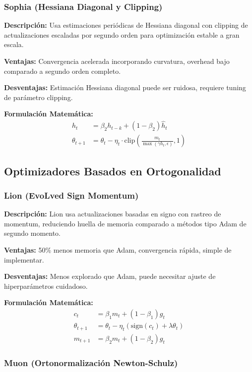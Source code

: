 \documentclass[11pt,a4paper]{article}
\begin{document}
\subsubsection{Sophia (Hessiana Diagonal y Clipping)}

\textbf{Descripción:} Usa estimaciones periódicas de Hessiana diagonal con clipping de actualizaciones escaladas por segundo orden para optimización estable a gran escala.

\textbf{Ventajas:} Convergencia acelerada incorporando curvatura, overhead bajo comparado a segundo orden completo.

\textbf{Desventajas:} Estimación Hessiana diagonal puede ser ruidosa, requiere tuning de parámetro clipping.

\textbf{Formulación Matemática:}
\begin{align}
h_t &= \beta_2 h_{t-k} + (1 - \beta_2) \hat{h}_t \\
\theta_{t+1} &= \theta_t - \eta_t \cdot \text{clip} \left( \frac{m_t}{\max(\gamma h_t, \epsilon)}, 1 \right)
\end{align}

\subsection{Optimizadores Basados en Ortogonalidad}

\subsubsection{Lion (EvoLved Sign Momentum)}

\textbf{Descripción:} Lion usa actualizaciones basadas en signo con rastreo de momentum, reduciendo huella de memoria comparado a métodos tipo Adam de segundo momento.

\textbf{Ventajas:} 50\% menos memoria que Adam, convergencia rápida, simple de implementar.

\textbf{Desventajas:} Menos explorado que Adam, puede necesitar ajuste de hiperparámetros cuidadoso.

\textbf{Formulación Matemática:}
\begin{align}
c_t &= \beta_1 m_t + (1 - \beta_1) g_t \\
\theta_{t+1} &= \theta_t - \eta_t (\text{sign}(c_t) + \lambda \theta_t) \\
m_{t+1} &= \beta_2 m_t + (1 - \beta_2) g_t
\end{align}

\subsubsection{Muon (Ortonormalización Newton-Schulz)}
\end{document}
